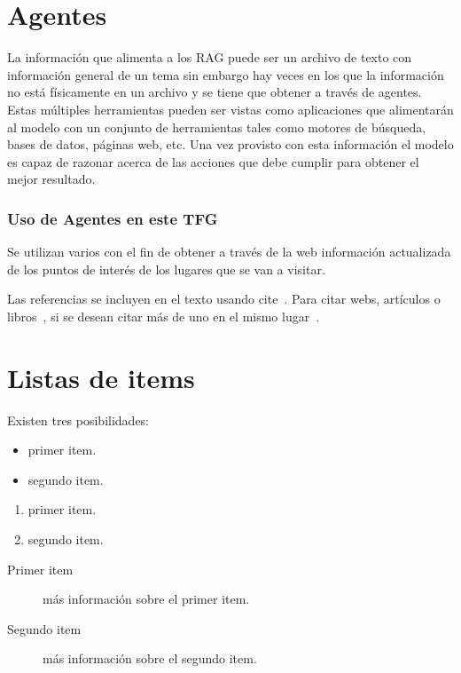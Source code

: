 \section{Agentes}
\label{sec:agentes}
La información que alimenta a los RAG puede ser un archivo de texto con información general de un tema sin embargo hay veces en los que la información no está físicamente en un archivo y se tiene que obtener a través de agentes.
Estas múltiples herramientas pueden ser vistas como aplicaciones que alimentarán al modelo con un conjunto de herramientas tales como motores de búsqueda, bases de datos, páginas web, etc. Una vez provisto con esta información el modelo es capaz de razonar acerca de las acciones que debe cumplir para obtener el mejor resultado.
\subsubsection{Uso de Agentes en este TFG}
Se utilizan varios con el fin de obtener a través de la web información actualizada de los puntos de interés de los lugares que se van a visitar.



Las referencias se incluyen en el texto usando cite~\cite{wiki:latex}. Para citar webs, artículos o libros~\cite{koza92}, si se desean citar más de uno en el mismo lugar~\cite{bortolot2005, koza92}.

\section{Listas de items}

Existen tres posibilidades:

\begin{itemize}
	\item primer item.
	\item segundo item.
\end{itemize}

\begin{enumerate}
	\item primer item.
	\item segundo item.
\end{enumerate}

\begin{description}
	\item[Primer item] más información sobre el primer item.
	\item[Segundo item] más información sobre el segundo item.
\end{description}
	
